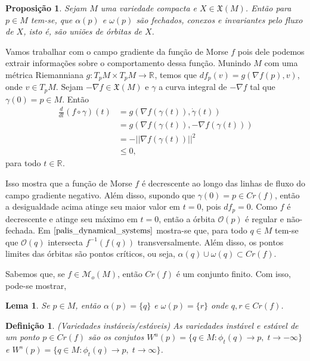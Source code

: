 \documentclass[12pt]{book}
\newtheorem{lema}[teorema]{Lema}
\newtheorem{definicao}[teorema]{Definição}
\newtheorem{proposicao}[teorema]{Proposição}
\newcommand{\campossuaves}[1]{\mathfrak{X}(#1)}
\newcommand{\derivada}[2]{\frac{d #1}{d #2}}
\newcommand{\funcoesmorse}[1]{\mathcal{M}_{o}(#1)}
\newcommand{\gradiente}{\nabla f}
\newcommand{\norma}[1]{||#1||}
\newcommand{\orbitaponto}[1]{\mathcal{O}(#1)}
\newcommand{\pontoscriticos}[1]{\textit{Cr}(#1)}
\newcommand{\real}[1]{\mathbb{R}^{#1}}
\newcommand{\reta}{\real{}}
\newcommand{\variedadeestavel}[1]{W^{s}(#1)}
\newcommand{\variedadeinstavel}[1]{W^{u}(#1)}
\begin{document}
	\begin{proposicao}
		Sejam $M$ uma variedade compacta e $X\in \campossuaves{M}$. Então para $p \in M$ tem-se, que $\alpha(p)$ e $\omega(p)$ são fechados, conexos e invariantes pelo fluxo de $X$, isto é, são uniões de órbitas de $X$.
	\end{proposicao}
	
	Vamos trabalhar com o campo gradiente da função de Morse $f$ pois dele podemos extrair informações sobre o comportamento dessa função. Munindo $M$ com uma métrica Riemanniana $g: T_{p}M \times T_{p}M \to \reta$, temos que $df_{p}(v) = g(\nabla f(p), v)$, onde $v \in T_{p}M$. Sejam $-\gradiente \in \campossuaves{M}$ e $\gamma$ a curva integral de $-\gradiente $ tal que $\gamma(0) = p\in M$. Então
	$$
	\begin{aligned}
	\derivada{}{t}(f \circ \gamma)(t) &= g(\gradiente(\gamma(t)), \dot{\gamma}(t)) 
	\\
	&=g(\gradiente(\gamma(t)), -\gradiente(\gamma(t))) 
	\\
	&= -\norma{\gradiente(\gamma(t))}^{2}
	\\
	&\leq 0,
	\end{aligned}
	$$
	para todo $t \in \reta$.
	
	Isso mostra que a função de Morse $f$ é decrescente ao longo das linhas de fluxo do campo gradiente negativo. Além disso, supondo que $\gamma(0) =p\in \pontoscriticos{f}$, então a desigualdade acima atinge seu maior valor em $t=0$, pois $df_{p }= 0$. Como $f$ é decrescente e atinge seu máximo em $t=0$, então a órbita $\orbitaponto{p}$ é regular e não-fechada. Em $\cite{palis_dynamical_systems}$ mostra-se que, para todo $q \in M$ tem-se que $\orbitaponto{q}$ intersecta $f^{-1}(f(q))$ transversalmente. Além disso, os pontos limites das órbitas são pontos críticos, ou seja, $\alpha(q)\cup\omega(q) \subset \pontoscriticos{f}$.
	
	Sabemos que, se $f \in \funcoesmorse{M}$, então $\pontoscriticos{f}$ é um conjunto finito. Com isso, pode-se mostrar, 
	
	\begin{lema}\label{lema_conjunto_limite_funcao_morse}
		Se 
		$p \in M$, então $\alpha(p)  = \{q\}$ e $\omega(p) = \{r\}$ onde $q, r \in \pontoscriticos{f}$.
	\end{lema}
	
	\begin{definicao}
		(Variedades instáveis/estáveis)  As variedades instável e estável de um ponto $p \in \pontoscriticos{f}$ são os conjutos $\variedadeinstavel{p} = \{q\in M: \phi_{t}(q) \to p,\; t\to -\infty\}$ e $\variedadeestavel{p} = \{q\in M: \phi_{t}(q) \to p,\; t\to \infty\}$.
	\end{definicao}
	
\end{document}
